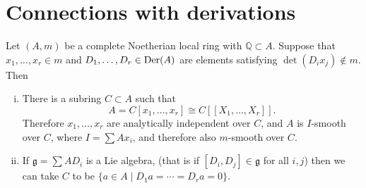 \section{Connections with derivations}\label{sec:30}

\begin{theorem}\label{thm:30.1}
Let $(A, m)$ be a complete Noetherian local ring with $\mathbb{Q} \subset A$. Suppose that
$x_1, \ldots, x_r \in m$ and $D_1, \ldots, D_r \in \operatorname{Der}(A)$ are elements satisfying
$\det(D_ix_j) \notin m$. Then
\begin{enumerate}[(i)]
  \item There is a subring $C \subset A$ such that
        \[
          A = C[x_1, \ldots, x_r] \cong C[[X_1, \ldots, X_r]].
        \]
        Therefore $x_1, \ldots, x_r$ are analytically independent over $C$, and $A$ is
        $I$-smooth over $C$, where $I = \sum Ax_i$, and therefore also $m$-smooth over
        $C$.
  \item If $\mathfrak{g} = \sum AD_i$ is a Lie algebra, (that is if $[D_i, D_j] \in \mathfrak{g}$ for all
        $i, j$) then we can take $C$ to be $\{a \in A \mid D_1a = \cdots = D_ra = 0\}$.
\end{enumerate}
\end{theorem}

